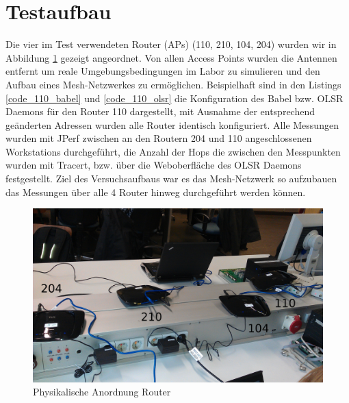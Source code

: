 \documentclass[10pt]{scrartcl}
\author{André Harms, Oliver Steenbuck}
\title{\titletext}
\date{09.11.2011}
\begin{document}
\maketitle

\setcounter{tocdepth}{3}
\tableofcontents

	\listoffigures   

\section{Testaufbau}
	Die vier im Test verwendeten Router (APs) (110, 210, 104, 204) wurden wir in Abbildung \ref{img:testAufbau} gezeigt angeordnet. 	Von allen Access Points wurden die Antennen entfernt um reale Umgebungsbedingungen im Labor zu simulieren und den Aufbau eines Mesh-Netzwerkes zu ermöglichen. Beispielhaft sind in den Listings \ref{code_110_babel} und \ref{code_110_olsr} die Konfiguration des Babel bzw. OLSR Daemons für den Router 110 dargestellt, mit Ausnahme der entsprechend geänderten Adressen wurden alle Router identisch konfiguriert.  
		Alle Messungen wurden mit JPerf zwischen an den Routern 204 und 110 angeschlossenen Workstations durchgeführt, die Anzahl der Hops die zwischen den Messpunkten wurden mit Tracert, bzw. über die Weboberfläche des OLSR Daemons festgestellt. Ziel des Versuchsaufbaus war es das Mesh-Netzwerk so aufzubauen das Messungen über alle 4 Router hinweg durchgeführt werden können.
		
	\begin{figure}[H]
        \centering
                \includegraphics[width=\textwidth]{img/AufbauBild}
        \caption{Physikalische Anordnung Router}
        \label{img:testAufbau}
	\end{figure}	
	
\end{document}
